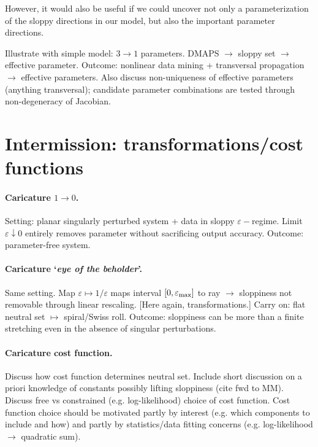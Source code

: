 \documentclass{article}
\newcommand{\eps}{\varepsilon}
\begin{document}
However, it would also be useful if we could uncover not only a
parameterization of the sloppy directions in our model, but also the
important parameter directions.


Illustrate with simple model: $3 \rightarrow 1$ parameters. DMAPS
$\rightarrow$ sloppy set $\rightarrow$ effective parameter. Outcome:
nonlinear data mining + transversal propagation $\rightarrow$
effective parameters.  Also discuss non-uniqueness of effective
parameters (anything transversal); candidate parameter combinations
are tested through non-degeneracy of Jacobian.



\section{Intermission: transformations/cost functions}

\paragraph{Caricature $1 \rightarrow 0$.}
Setting: planar singularly perturbed system + data in sloppy $\eps-$regime.
Limit $\eps \downarrow 0$ entirely removes parameter
without sacrificing output accuracy.
Outcome: parameter-free system.

\paragraph{Caricature `{\it eye of the beholder}'.}
Same setting.  Map $\eps \mapsto 1/\eps$ maps interval
$[0,\eps_{\rm max}]$ to ray $\rightarrow$ sloppiness not removable
through linear rescaling.  [Here again, transformations.]  Carry on:
flat neutral set $\mapsto$ spiral/Swiss roll.  Outcome: sloppiness can
be more than a finite stretching even in the absence of singular
perturbations.

\paragraph{Caricature cost function.}
Discuss how cost function determines neutral set.
Include short discussion on a priori knowledge of constants
possibly lifting sloppiness (cite fwd to MM).
Discuss free vs constrained (e.g. log-likelihood) choice of cost function.
Cost function choice should be motivated
partly by interest (e.g. which components to include and how)
and partly by statistics/data fitting concerns
(e.g. log-likelihood $\rightarrow$ quadratic sum).
\end{document}
